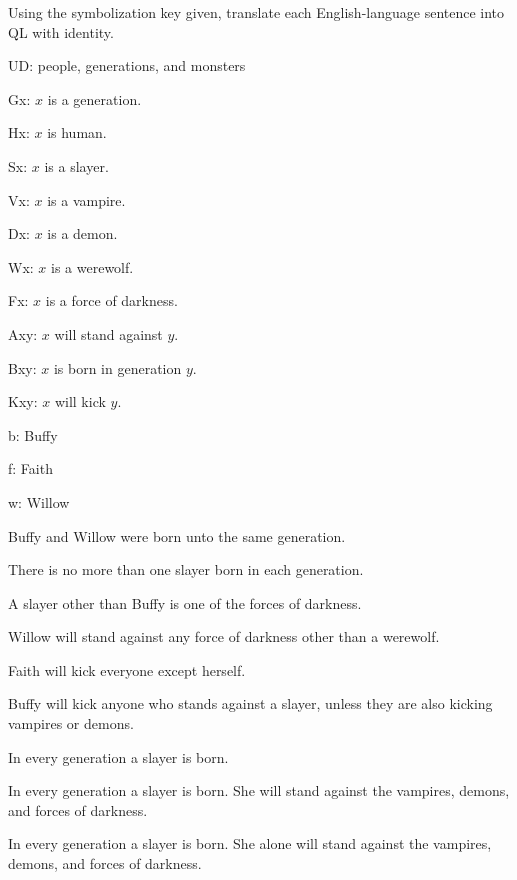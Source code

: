 \solutions
\problempart
\label{pr.QLbuffy}
Using the symbolization key given, translate each English-language sentence into QL with identity.
\begin{ekey}
\item[UD:] people, generations, and monsters
\item[Gx:] $x$ is a generation.
\item[Hx:] $x$ is human.
\item[Sx:] $x$ is a slayer.
\item[Vx:] $x$ is a vampire.
\item[Dx:] $x$ is a demon.
\item[Wx:] $x$ is a werewolf.
\item[Fx:] $x$ is a force of darkness.
\item[Axy:] $x$ will stand against $y$.
\item[Bxy:] $x$ is born in generation $y$.
\item[Kxy:] $x$ will kick $y$.
\item[b:] Buffy
\item[f:] Faith
\item[w:] Willow
\end{ekey}
\begin{earg}
\item Buffy and Willow were born unto the same generation.
\item There is no more than one slayer born in each generation.
\item A slayer other than Buffy is one of the forces of darkness.
\item Willow will stand against any force of darkness other than a werewolf.
\item Faith will kick everyone except herself.
\item Buffy will kick anyone who stands against a slayer, unless they are also kicking vampires or demons.
\item In every generation a slayer is born.
\item In every generation a slayer is born. She will stand against the vampires, demons, and forces of darkness.
\item In every generation a slayer is born. She alone will stand against the vampires, demons, and forces of darkness.
\end{earg}



